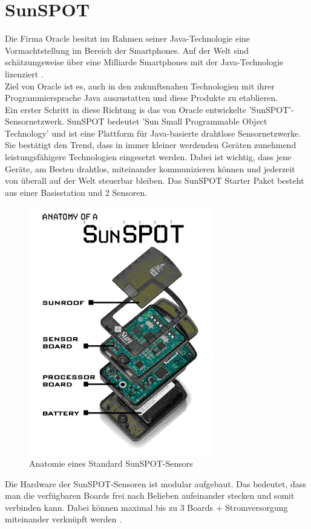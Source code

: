 \section{SunSPOT}\label{s:Sunspot}

Die Firma Oracle besitzt im Rahmen seiner Java-Technologie eine Vormachtstellung im Bereich der Smartphones.
Auf der Welt sind schätzungsweise über eine Milliarde Smartphones mit der Java-Technologie lizenziert \cite{d:horan}.  \\ Ziel von Oracle ist es, auch in den zukunftsnahen Technologien mit ihrer Programmiersprache Java auszustatten und diese Produkte zu etablieren.\\

Ein erster Schritt in diese Richtung is das von Oracle entwickelte 'SunSPOT'-Sensornetzwerk. SunSPOT bedeutet 'Sun Small Programmable Object Technology' und ist eine Plattform für Java-basierte drahtlose Sensornetzwerke. Sie bestätigt den Trend, dass in immer kleiner werdenden Geräten zunehmend leistungsfähigere Technologien eingesetzt werden. Dabei ist wichtig, dass jene Geräte, am Besten drahtlos, miteinander kommunizieren können und jederzeit von überall auf der Welt steuerbar bleiben. Das SunSPOT Starter Paket besteht aus einer Basisstation und 2 Sensoren. \\

\begin{figure}[H] 
	\centering
	\includegraphics[scale=0.5]{Bilder/spotanatomy}
	\caption{Anatomie eines Standard SunSPOT-Sensors\cite{i:spotaufbau}}
	\label{f:spotaufbau}
\end{figure}

Die Hardware der SunSPOT-Sensoren ist modular aufgebaut. Das bedeutet, dass man die verfügbaren Boards frei nach Belieben aufeinander stecken und somit verbinden kann. Dabei können maximal bis zu 3 Boards + Stromversorgung miteinander verknüpft werden \cite{d:horan}.  \\

